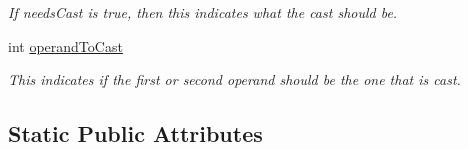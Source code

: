 \begin{DoxyCompactItemize}
\begin{DoxyCompactList}\small\item\em If needs\-Cast is true, then this indicates what the cast should be. \end{DoxyCompactList}\item 
\hypertarget{classAST_aea9b07b39d24183f38c0029cec0a878e}{int \hyperlink{classAST_aea9b07b39d24183f38c0029cec0a878e}{operand\-To\-Cast}}\label{classAST_aea9b07b39d24183f38c0029cec0a878e}

\begin{DoxyCompactList}\small\item\em This indicates if the first or second operand should be the one that is cast. \end{DoxyCompactList}\end{DoxyCompactItemize}
\subsection*{Static Public Attributes}
